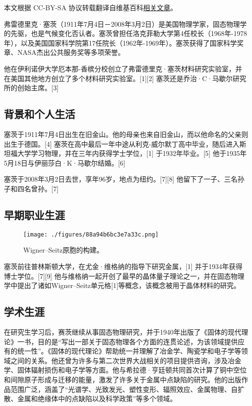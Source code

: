 
本文根据 CC-BY-SA 协议转载翻译自维基百科\href{https://en.wikipedia.org/wiki/Frederick_Seitz}{相关文章}。

弗雷德里克·塞茨（1911年7月4日－2008年3月2日）是美国物理学家，固态物理学的先驱，也是气候变化否认者。塞茨曾担任洛克菲勒大学第4任校长（1968年-1978年），以及美国国家科学院第17任院长（1962年-1969年）。塞茨获得了国家科学奖章、NASA杰出公共服务奖等多项荣誉。

他在伊利诺伊大学厄本那-香槟分校创立了弗雷德里克·塞茨材料研究实验室，并在美国其他地方创立了多个材料研究实验室。[1][2] 塞茨还是乔治·C·马歇尔研究所的创始主席。[3]
\subsection{背景和个人生活} 
塞茨于1911年7月4日出生在旧金山。他的母亲也来自旧金山，而以他命名的父亲则出生于德国。[4] 塞茨在高中最后一年中途从利克-威尔默丁高中毕业，随后进入斯坦福大学学习物理，并在三年内获得学士学位，[1] 于1932年毕业。[5] 他于1935年5月18日与伊丽莎白·K·马歇尔结婚。[6]

塞茨于2008年3月2日去世，享年96岁，地点为纽约。[7][8] 他留下了一子、三名孙子和四名曾孙。[7]
\subsection{早期职业生涯}
\begin{figure}[ht]
\centering
\texttt{[image: ./figures/88a94b6bc3e7a33c.png]}
\caption{Wigner–Seitz原胞的构建。} \label{fig_Seitz_1}
\end{figure}
塞茨前往普林斯顿大学，在尤金·维格纳的指导下研究金属，[1] 并于1934年获得博士学位。[7][9] 他与维格纳一起开创了最早的晶体量子理论之一，并在固态物理学中提出了诸如Wigner–Seitz单元格[1]等概念，该概念被用于晶体材料的研究。
\subsection{学术生涯}  
在研究生学习后，赛茨继续从事固态物理研究，并于1940年出版了《固体的现代理论》一书，目的是“写出一部关于固态物理各个方面的连贯论述，为该领域提供应有的统一性”。《固体的现代理论》帮助统一并理解了冶金学、陶瓷学和电子学等领域之间的关系。他还曾为许多与第二次世界大战相关的项目提供咨询，涉及冶金学、固体辐射损伤和电子学等方面。他与希拉德·亨廷顿共同首次计算了铜中空位和间隙原子形成与迁移的能量，激发了许多关于金属中点缺陷的研究。他的出版作品范围广泛，涵盖了“光谱学、光致发光、塑性变形、辐照效应、金属物理、自扩散、金属和绝缘体中的点缺陷以及科学政策”等多个领域。

